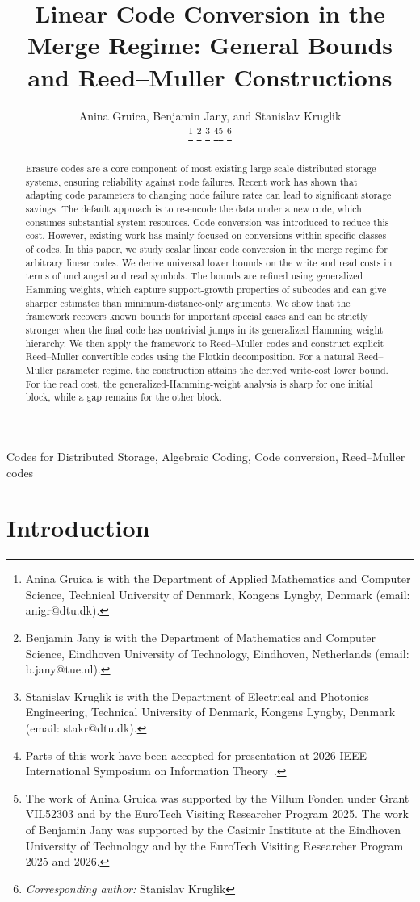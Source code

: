 \documentclass[conference, 10pt]{IEEEtran}
\title{{\huge{Linear Code Conversion in the Merge Regime: General Bounds and Reed--Muller Constructions}
}\vspace{-1ex}}
\author{
    Anina Gruica\IEEEauthorrefmark{1}, 
    Benjamin Jany\IEEEauthorrefmark{2}, 
    and Stanislav Kruglik\IEEEauthorrefmark{3}%
    
    \thanks{\IEEEauthorrefmark{1}Anina Gruica is with the Department of Applied Mathematics and Computer Science, Technical University of Denmark, Kongens Lyngby, Denmark (email: anigr@dtu.dk).}
    \thanks{\IEEEauthorrefmark{2}Benjamin Jany is with the Department of Mathematics and Computer Science, Eindhoven University of Technology, Eindhoven, Netherlands (email: b.jany@tue.nl).}
    \thanks{\IEEEauthorrefmark{3}Stanislav Kruglik is with the Department of Electrical and Photonics Engineering, Technical University of Denmark, Kongens Lyngby, Denmark (email: stakr@dtu.dk).}
    \thanks{Parts of this work have been accepted for presentation at 2026 IEEE International Symposium on Information Theory~\cite{gruica2026convertible}.}\thanks{The work of Anina Gruica was supported by the Villum Fonden under Grant VIL52303 and by the EuroTech Visiting Researcher Program 2025. The work of Benjamin Jany was supported by the Casimir Institute at the Eindhoven University of Technology and by the EuroTech Visiting Researcher Program 2025 and 2026.}
    \thanks{\textit{Corresponding author:} Stanislav Kruglik}
    }
\theoremstyle{plain}
\theoremstyle{definition}
\begin{document}
\date{}


\maketitle


	

	

\begin{abstract}
Erasure codes are a core component of most existing large-scale distributed storage systems, ensuring reliability against node failures. Recent work has shown that adapting code parameters to changing node failure rates can lead to significant storage savings. The default approach is to re-encode the data under a new code, which consumes substantial system resources. Code conversion was introduced to reduce this cost. However, existing work has mainly focused on conversions within specific classes of codes. In this paper, we study scalar linear code conversion in the merge regime for arbitrary linear codes. We derive universal lower bounds on the write and read costs in terms of unchanged and read symbols. The bounds are refined using generalized Hamming weights, which capture support-growth properties of subcodes and can give sharper estimates than minimum-distance-only arguments. We show that the framework recovers known bounds for important special cases and can be strictly stronger when the final code has nontrivial jumps in its generalized Hamming weight hierarchy. We then apply the framework to Reed--Muller codes and construct explicit Reed--Muller convertible codes using the Plotkin decomposition. For a natural Reed--Muller parameter regime, the construction attains the derived write-cost lower bound. For the read cost, the generalized-Hamming-weight analysis is sharp for one initial block, while a gap remains for the other block. 

\end{abstract}

\begin{IEEEkeywords}
Codes for Distributed Storage, Algebraic Coding, Code conversion, Reed--Muller codes
\end{IEEEkeywords}

\section{Introduction}
\end{document}
